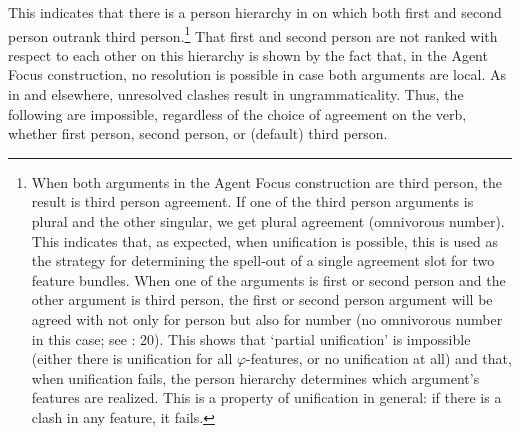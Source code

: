\documentclass[output=paper]{langsci/langscibook}
\begin{document}
This indicates that there is a person hierarchy in  on which both first and second person outrank third person.\footnote{When both arguments in the Agent Focus construction are third person, the result is third person agreement. If one of the third person arguments is plural and the other singular, we get plural agreement (omnivorous number). This indicates that, as expected, when unification is possible, this is used as the strategy for determining the spell-out of a single agreement slot for two feature bundles. When one of the arguments is first or second person and the other argument is third person, the first or second person argument will be agreed with not only for person but also for number (no omnivorous number in this case; see \citealt{Preminger2014}: 20). This shows that ‘partial unification’ is impossible (either there is unification for all $\varphi $-features, or no unification at all) and that, when unification fails, the person hierarchy determines which argument’s features are realized. This is a property of unification in general: if there is a clash in any feature, it fails.} That first and second person are not ranked with respect to each other on this hierarchy is shown by the fact that, in the Agent Focus construction, no resolution is possible in case both arguments are local. As in  and elsewhere, unresolved clashes result in ungrammaticality. Thus, the following are impossible, regardless of the choice of agreement on the verb, whether first person, second person, or (default) third person.

\ea 
{}
\z
\z
\end{document}
